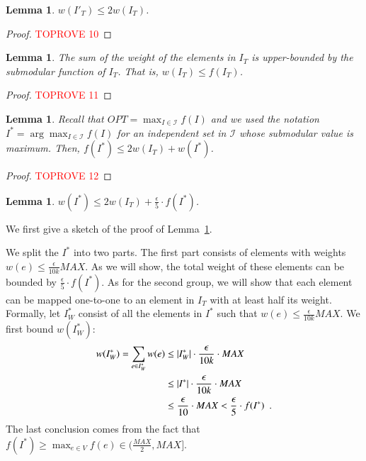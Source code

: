 \documentclass[11pt]{article}
\newtheorem{lemma}[theorem]{Lemma}
\begin{document}
\begin{lemma}
    \label{lm:wK_le_wI}
    $w(I'_T) \le 2w(I_T)$.
\end{lemma}

\begin{proof}\textcolor{red}{TOPROVE 10}\end{proof}



\begin{lemma}
\label{lm:wI_le_fI}
    The sum of the weight of the elements in $I_T$ 
    is upper-bounded by the submodular function of $I_T$.  
    That is, $w(I_T) \le f(I_T)$. 
\end{lemma}

\begin{proof}\textcolor{red}{TOPROVE 11}\end{proof}




\begin{lemma}
\label{lm:fIstar_2fI_wI}
 Recall that $OPT = \max_{I \in \mathcal{I}} f(I)$ and we 
 used the notation $I^* = \arg\max_{I \in \mathcal{I}} f(I) $ 
 for an independent set in $\mathcal{I}$ whose submodular value is maximum. 
Then, $f(I^*) \le 2w(I_T) + w(I^*)$.
\end{lemma}


\begin{proof}\textcolor{red}{TOPROVE 12}\end{proof}

\begin{lemma}
\label{lm:modular}
    $w(I^*) \le  2w(I_T) + \frac{\epsilon}{5} \cdot f(I^*)$.
\end{lemma}


We first give a sketch of the proof of Lemma~\ref{lm:modular}.

We split the $I^*$ into two parts. The first part consists of elements with weights $w(e) \le \frac{\epsilon}{10k}MAX$. As we will show, the total weight of these elements can be bounded by $\frac{\epsilon}{5} \cdot f(I^*)$. As for the second group, we will show that each element can be mapped one-to-one to an element in $I_T$ with at least half its weight. 
~\\
Formally, 
let $I^*_{W}$ consist of all the elements in $I^*$ such that
$w(e) \le \frac{\epsilon}{10k}MAX$. 
We first bound $w(I^*_{W})$:
\begin{align}
    w(I^*_{W})
    =\sum_{e \in I^*_{W}} w(e) 
       \notag
    &\le |I^*_{W}| \cdot \frac{\epsilon}{10k}\cdot MAX
       \notag
    \\&\le |I^*| \cdot \frac{\epsilon}{10k} \cdot MAX
       \notag
   \\& \le \frac{\epsilon}{10} \cdot MAX < \frac{\epsilon}{5} \cdot f(I^*) \enspace .
   \label{eq:jul5_1442}
\end{align}
The last conclusion comes from the fact that $f(I^*) \ge \max_{e \in V} f(e) \in (\frac{MAX}{2}, MAX]$.
\end{document}
